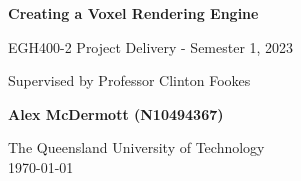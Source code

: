 \documentclass[titlepage]{article}
\begin{document}
\begin{titlepage}
    \begin{center}
        \vspace*{7cm}

        \Huge
        \textbf{Creating a Voxel Rendering Engine}

        \vspace{0.5cm}

        \Large
        EGH400-2 Project Delivery - Semester 1, 2023

        \vspace{0.25cm}

        \large
        Supervised by Professor Clinton Fookes

        \vspace{0.5cm}

        \Large
        \textbf{Alex McDermott (N10494367)}

        \vfill

        \Large
        The Queensland University of Technology\\
        \today
    \end{center}
\end{titlepage}

\tableofcontents
\listoffigures
\printnoidxglossary[type=\acronymtype]
\newpage


\end{document}
